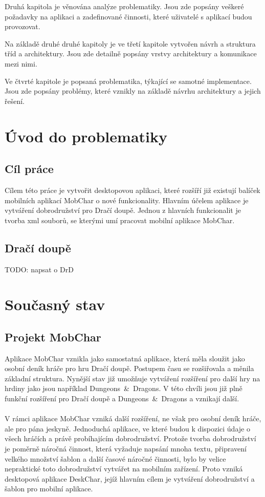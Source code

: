 \documentclass[thesis=B,czech]{resources/FITthesis}[2012/06/26]
\begin{document}
\begin{introduction}
Druhá kapitola je věnována analýze problematiky. Jsou zde popsány veškeré požadavky na aplikaci a zadefinované činnosti, které uživatelé s aplikací budou provozovat.

Na základě druhé druhé kapitoly je ve třetí kapitole vytvořen návrh a struktura tříd a architektury. Jsou zde detailně popsány vrstvy architektury a komunikace mezi nimi.

Ve čtvrté kapitole je popsaná problematika, týkající se samotné implementace. Jsou zde popsány problémy, které vznikly na základě návrhu architektury a jejich řešení.


\end{introduction}

\chapter{Úvod do problematiky}




	\section{Cíl práce}
Cílem této práce je vytvořit desktopovou aplikaci, které rozšíří již existují balíček mobilních aplikací MobChar o nové funkcionality. Hlavním účelem aplikace je vytváření dobrodružství pro Dračí doupě. Jednou z hlavních funkcionalit je tvorba xml souborů, se kterými umí pracovat mobilní aplikace MobChar.
	\section{Dračí doupě}
		TODO: napsat o DrD



\chapter{Současný stav}
	\section{Projekt MobChar}	
Aplikace MobChar vznikla jako samostatná aplikace, která měla sloužit jako osobní deník hráče pro hru Dračí doupě. Postupem času se rozšiřovala a měnila základní struktura. Nynější stav již umožňuje vytváření rozšíření pro další hry na hrdiny jako jsou například Dungeons~\&~Dragons. V této chvíli jsou již plně funkční rozšíření pro Dračí doupě a Dungeons~\&~Dragons a vznikají další.\\
\\
V rámci aplikace MobChar vzniká další rozšíření, ne však pro osobní deník hráče, ale pro pána jeskyně. Jednoduchá aplikace, ve které budou k dispozici údaje o všech hráčích a právě probíhajícím dobrodružství. Protože tvorba dobrodružství je poměrně náročná činnost, která vyžaduje napsání mnoha textu, připravení velkého množství šablon a další časové náročné činnosti, bylo by velice nepraktické toto dobrodružství vytvářet na mobilním zařízení. Proto vzniká desktopová aplikace DeskChar, jejíž hlavním cílem je vytváření dobrodružství a šablon pro mobilní aplikace.
\end{document}
